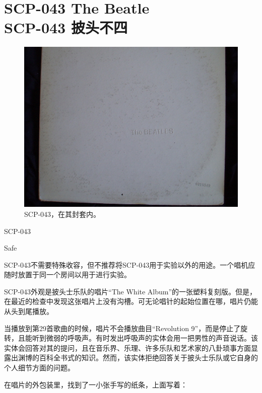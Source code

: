 \chapter[SCP-043 披头不四]{
    SCP-043 The Beatle\\
    SCP-043 披头不四
}

\label{chap:SCP-043}

\begin{figure}[H]
    \centering
    \includegraphics[width=0.5\linewidth]{images/SCP.043.jpg}
    \caption*{SCP-043，在其封套内。}
\end{figure}

SCP-043

Safe

SCP-043不需要特殊收容，但不推荐将SCP-043用于实验以外的用途。一个唱机应随时放置于同一个房间以用于进行实验。

SCP-043外观是披头士乐队的唱片“The White Album”的一张塑料复刻版。但是，在最近的检查中发现这张唱片上没有沟槽。可无论唱针的起始位置在哪，唱片仍能从头到尾播放。

当播放到第29首歌曲的时候，唱片不会播放曲目“Revolution 9”，而是停止了旋转，且能听到微弱的呼吸声。有时发出呼吸声的实体会用一把男性的声音说话。该实体会回答对其的提问，且在音乐界、乐理、许多乐队和艺术家的八卦琐事方面显露出渊博的百科全书式的知识。然而，该实体拒绝回答关于披头士乐队或它自身的个人细节方面的问题。

在唱片的外包装里，找到了一小张手写的纸条，上面写着：

\begin{scpbox}




\end{scpbox}
